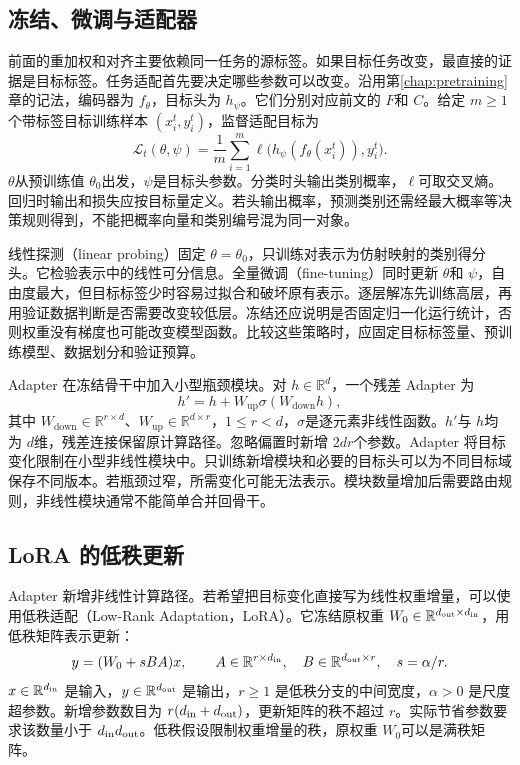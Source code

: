 \subsection{冻结、微调与适配器}
前面的重加权和对齐主要依赖同一任务的源标签。如果目标任务改变，最直接的证据是目标标签。任务适配首先要决定哪些参数可以改变。沿用第\ref{chap:pretraining}章的记法，编码器为 $f_\theta$，目标头为 $h_\psi$。它们分别对应前文的 $F$和 $C$。给定 $m\geq1$个带标签目标训练样本 $(x_i^t,y_i^t)$，监督适配目标为
\begin{equation}
 \mathcal L_t(\theta,\psi)=\frac1m\sum_{i=1}^m
 \ell\bigl(h_\psi(f_\theta(x_i^t)),y_i^t\bigr).
\end{equation}
$\theta$从预训练值 $\theta_0$出发，$\psi$是目标头参数。分类时头输出类别概率，$\ell$可取交叉熵。回归时输出和损失应按目标量定义。若头输出概率，预测类别还需经最大概率等决策规则得到，不能把概率向量和类别编号混为同一对象。

线性探测（linear probing）固定 $\theta=\theta_0$，只训练对表示为仿射映射的类别得分头。它检验表示中的线性可分信息。全量微调（fine-tuning）同时更新 $\theta$和 $\psi$，自由度最大，但目标标签少时容易过拟合和破坏原有表示。逐层解冻先训练高层，再用验证数据判断是否需要改变较低层。冻结还应说明是否固定归一化运行统计，否则权重没有梯度也可能改变模型函数。比较这些策略时，应固定目标标签量、预训练模型、数据划分和验证预算。

Adapter 在冻结骨干中加入小型瓶颈模块。对 $h\in\mathbb R^d$，一个残差 Adapter 为
\begin{equation}
 h'=h+W_{\mathrm{up}}\sigma(W_{\mathrm{down}}h),
\end{equation}
其中 $W_{\mathrm{down}}\in\mathbb R^{r\times d}$、$W_{\mathrm{up}}\in\mathbb R^{d\times r}$，$1\leq r<d$，$\sigma$是逐元素非线性函数。$h'$与 $h$均为 $d$维，残差连接保留原计算路径。忽略偏置时新增 $2dr$个参数。Adapter 将目标变化限制在小型非线性模块中\cite{houlsby2019adapter}。只训练新增模块和必要的目标头可以为不同目标域保存不同版本。若瓶颈过窄，所需变化可能无法表示。模块数量增加后需要路由规则，非线性模块通常不能简单合并回骨干。

\subsection{LoRA 的低秩更新}
Adapter 新增非线性计算路径。若希望把目标变化直接写为线性权重增量，可以使用低秩适配（Low-Rank Adaptation，LoRA）\cite{hu2021lora}。它冻结原权重 $W_0\in\mathbb R^{d_{\rm out}\times d_{\rm in}}$，用低秩矩阵表示更新：
\begin{equation}
 y=(W_0+sBA)x,
\qquad A\in\mathbb R^{r\times d_{\rm in}},\quad
 B\in\mathbb R^{d_{\rm out}\times r},\quad s=\alpha/r.
\label{eq:transfer-lora}
\end{equation}
$x\in\mathbb R^{d_{\rm in}}$ 是输入，$y\in\mathbb R^{d_{\rm out}}$ 是输出，$r\geq1$ 是低秩分支的中间宽度，$\alpha>0$ 是尺度超参数。新增参数数目为 $r(d_{\rm in}+d_{\rm out})$，更新矩阵的秩不超过 $r$。实际节省参数要求该数量小于 $d_{\rm in}d_{\rm out}$。低秩假设限制权重增量的秩，原权重 $W_0$可以是满秩矩阵。

